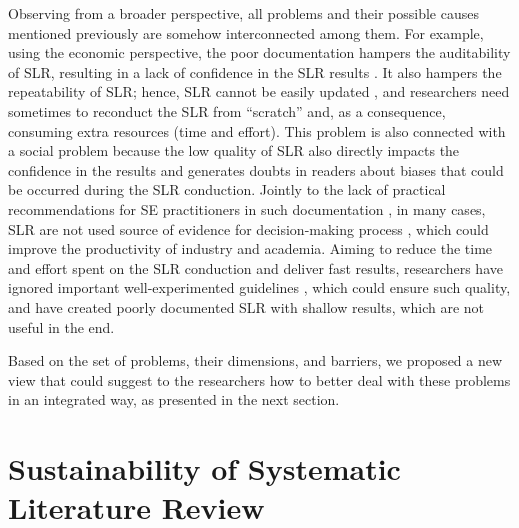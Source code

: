 \documentclass{article}
\begin{document}
Observing from a broader perspective, all problems and their possible causes mentioned previously are somehow interconnected among them. For example, using the economic perspective, the poor documentation hampers the auditability of SLR, resulting in a lack of confidence in the SLR results \cite{Zhou2016Threats,Ampatzoglou2019,Riaz2010}. It also hampers the repeatability of SLR; hence, SLR cannot be easily updated \cite{Kitchenham2011Repeatability}, and researchers need sometimes to reconduct the SLR from ``scratch'' and, as a consequence, consuming extra resources (time and effort). This problem is also connected with a social problem because the low quality of SLR also directly impacts the confidence in the results and generates doubts in readers about biases that could be occurred during the SLR conduction. Jointly to the lack of practical recommendations for SE practitioners in such documentation \cite{Badampudi2019Contextualizing,Budgen2018Reporting}, in many cases, SLR are not used source of evidence for decision-making process \cite{Cartaxo2018Role}, which could improve the productivity of industry and academia. Aiming to reduce the time and effort spent on the SLR conduction and deliver fast results, researchers have ignored important well-experimented guidelines \cite{Budgen2018Reporting}, which could ensure such quality, and have created poorly documented SLR with shallow results, which are not useful in the end.

Based on the set of problems, their dimensions, and barriers, we proposed a new view that could suggest to the researchers how to better deal with these problems in an integrated way, as presented in the next section.

\section{Sustainability of Systematic Literature Review}
\label{sec:sus4slr}

\end{document}
